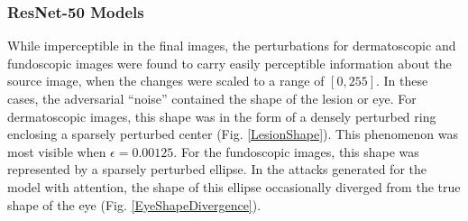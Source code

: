 \documentclass[10pt,twocolumn,letterpaper]{article}
\begin{document}
      \subsubsection{ResNet-50 Models}
        While imperceptible in the final images, the perturbations for dermatoscopic and fundoscopic images were found to carry easily perceptible information about the source image, when the changes were scaled to a range of $[0,255]$. In these cases, the adversarial ``noise'' contained the shape of the lesion or eye. For dermatoscopic images, this shape was in the form of a densely perturbed ring enclosing a sparsely perturbed center (Fig. \ref{LesionShape}). This phenomenon was most visible when $\epsilon=0.00125$. For the fundoscopic images, this shape was represented by a sparsely perturbed ellipse. In the attacks generated for the model with attention, the shape of this ellipse occasionally diverged from the true shape of the eye (Fig. \ref{EyeShapeDivergence}).
\end{document}
